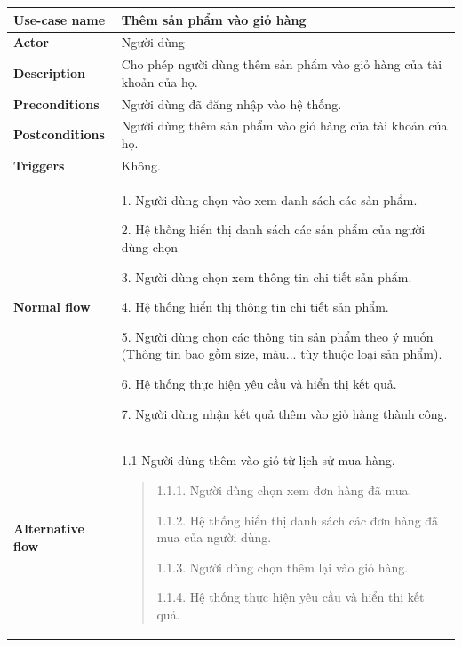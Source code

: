             \begin{longtable}{| p{} | p{} |} 
    \hline
    \textbf{Use-case name} 
    & 
    Thêm sản phẩm vào giỏ hàng
    \\
    \hline
    \textbf{Actor} 
    & 
    Người dùng
    \\
    \hline
    \textbf{Description} 
    & 
    Cho phép người dùng thêm sản phẩm vào giỏ hàng của tài khoản của họ.
    \\
    \hline
    \textbf{Preconditions} 
    &
    Người dùng đã đăng nhập vào hệ thống.
    \\
    \hline
    \textbf{Postconditions} 
    & 
    Người dùng thêm sản phẩm vào giỏ hàng của tài khoản của họ.
    \\
    \hline
    \textbf{Triggers} 
    &
    Không.
    \\
    \hline
    \begin{flushleft}
    \textbf{Normal flow}
    \end{flushleft}
    & 
        1. Người dùng chọn vào xem danh sách các sản phẩm.
        
        2. Hệ thống hiển thị danh sách các sản phẩm của người dùng chọn
        
        3. Người dùng chọn xem thông tin chi tiết sản phẩm.
        
        4. Hệ thống hiển thị thông tin chi tiết sản phẩm.
        
        5. Người dùng chọn các thông tin sản phẩm theo ý muốn (Thông tin bao gồm size, màu... tùy thuộc loại sản phẩm).
        
        6. Hệ thống thực hiện yêu cầu và hiển thị kết quả.
        
        7. Người dùng nhận kết quả thêm vào giỏ hàng thành công.
    \\
    \hline
    \begin{flushleft}
    \textbf{Alternative flow}
    \end{flushleft}
    & 
        1.1 Người dùng thêm vào giỏ từ lịch sử mua hàng.
        \begin{quote}
            1.1.1. Người dùng chọn xem đơn hàng đã mua.

            1.1.2. Hệ thống hiển thị danh sách các đơn hàng đã mua của người dùng.
        
            1.1.3. Người dùng chọn thêm lại vào giỏ hàng.
            
            1.1.4. Hệ thống thực hiện yêu cầu và hiển thị kết quả.
            

\end{quote}
\end{longtable}
